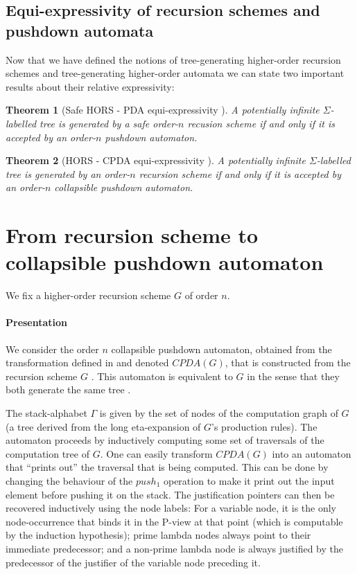 \documentclass[a4paper,draft]{article}[12pt]
\newtheorem{theorem}{Theorem}[section]
\theoremstyle{remark}
\theoremstyle{definition}
\begin{document}
\subsection{Equi-expressivity of recursion schemes and pushdown automata}

Now that we have defined the notions of tree-generating higher-order recursion schemes and 
tree-generating higher-order automata we can state two important results about their relative expressivity:

\begin{theorem}[Safe HORS - PDA equi-expressivity \cite{KNU02}]
A potentially infinite  $\Sigma$-labelled tree is generated by a \emph{safe} order-$n$ recusion scheme if and only if it is accepted by an order-$n$ pushdown automaton.
\end{theorem}

\begin{theorem}[HORS - CPDA equi-expressivity \cite{hmos-lics08}]
	A potentially infinite $\Sigma$-labelled tree is generated by an order-$n$ recursion scheme if and only if it is accepted by an order-$n$ collapsible pushdown automaton.
\end{theorem}




\section{From recursion scheme to collapsible pushdown automaton}

We fix a higher-order recursion scheme $G$ of order $n$.

\paragraph{Presentation}
We consider the order $n$ collapsible pushdown automaton, obtained from the transformation defined in \cite{hmos-lics08} and denoted $CPDA(G)$, that is constructed from the recursion scheme $G$ \cite[Definition 5.2]{hague-collaps-full}. This automaton is equivalent to $G$ in the sense that they both generate the same tree \cite{hmos-lics08}.

The stack-alphabet $\Gamma$ is given by the set of nodes of the computation graph of $G$ (a tree derived from the long eta-expansion of $G$'s production rules). The automaton proceeds by inductively computing some set of traversals of the computation tree of $G$. One can easily transform $CPDA(G)$ into an automaton that ``prints out'' the traversal that is being computed. This can be done by changing the behaviour of the $push_1$ operation to make it print out the input element before pushing it on the stack. The justification pointers can then be recovered inductively using the node labels: For a variable node, it is the only node-occurrence that binds it in the P-view at that point (which is computable by the induction hypothesis); prime lambda nodes always point to their immediate predecessor; and a non-prime lambda node is always justified by the predecessor of the justifier of the variable node preceding it.
\end{document}
